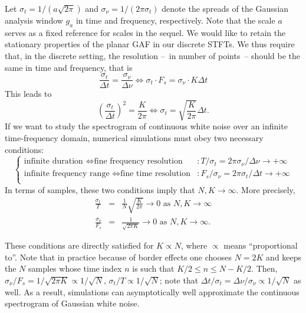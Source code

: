 Let $\sigma_t=1/(a\sqrt{2\pi})$ and $\sigma_\nu= 1/(2\pi\sigma_t)$
denote the spreads of the Gaussian analysis window $g_a$ in time and frequency, respectively. Note that the scale $a$ serves as a fixed reference for scales in the sequel. We would like to retain the stationary properties of the planar GAF in our discrete
STFTs. We thus require that, in the discrete setting, the resolution --~in number of points~-- should be the same in time and frequency, that is
\begin{equation}
\label{eq_isotropy}
	\frac{\sigma_t}{\Delta t} = \frac{\sigma_\nu}{\Delta \nu} \Longleftrightarrow \sigma_t \cdot F_s = \sigma_\nu \cdot K\Delta t
\end{equation}
This leads to
\begin{equation}
	\left(\frac{\sigma_t}{\Delta t}\right)^2 = \frac{K}{2\pi} \Leftrightarrow \sigma_t = \sqrt{\frac{K}{2\pi}}\Delta t.
\end{equation}
If we want to study the spectrogram of continuous white noise over an infinite time-frequency domain, numerical simulations must obey two necessary conditions:
\begin{equation}
	\begin{cases}
		\text{infinite duration } \Leftrightarrow \text{fine frequency resolution} & : T/\sigma_t = 2\pi\sigma_\nu/\Delta\nu \rightarrow + \infty\\
		\text{infinite frequency range }  \Leftrightarrow \text{fine time resolution} & : F_s/\sigma_\nu=2\pi\sigma_t/\Delta t \rightarrow + \infty\\
	\end{cases}
\end{equation}
In terms of samples, these two conditions imply that $N, K \rightarrow \infty$. More precisely, 
\begin{eqnarray}
	\frac{\sigma_t}{T} & = & \frac{1}{N}\sqrt{\frac{K}{2\pi}} \rightarrow 0 \text{ as } N, K \rightarrow \infty\\
	\frac{\sigma_\nu}{F_s} & = & \frac{1}{\sqrt{2\pi K}}\to 0 \text{ as } N, K \rightarrow \infty.
\end{eqnarray}

These conditions are directly satisfied for $K \propto N$, where $\propto$ means
``proportional to''. Note that in practice because of border effects one chooses $N = 2K$ and keeps the $N$ samples whose time index $n$ is such that $K/2 \leq n \leq N - K/2$. Then, $\sigma_\nu/F_s=1/\sqrt{2\pi K}\propto 1/\sqrt{N}$, $\sigma_t/T\propto 1/\sqrt{N}$; note that $\Delta t/\sigma_t=\Delta \nu/\sigma_\nu\propto 1/\sqrt{N}$ as well. As a result, simulations can asymptotically well approximate the continuous spectrogram of Gaussian white noise.

